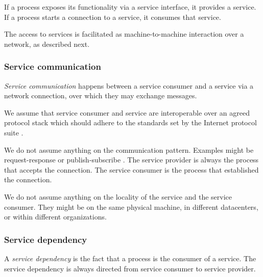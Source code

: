 If a process exposes its functionality via a service interface, it provides a service. If a process starts a connection to a service, it consumes that service.


The access to services is facilitated as machine-to-machine interaction over a network, as described next.

\subsubsection{Service communication}

\emph{Service communication} happens between a service consumer and a service via a network connection, over which they may exchange messages.

We assume that service consumer and service are interoperable over an agreed protocol stack which should adhere to the standards set by the Internet protocol suite \cite{internetprotocol}.

We do not assume anything on the communication pattern. Examples might be request-response \cite{requestresponse} or publish-subscribe \cite{publishsubscribe}. The service provider is always the process that accepts the connection. The service consumer is the process that established the connection.

We do not assume anything on the locality of the service and the service consumer. They might be on the same physical machine, in different datacenters, or within different organizations.

%

\subsubsection{Service dependency}
\label{subsec:service_depenedency}

A \emph{service dependency} is the fact that a process is the consumer of a service. The service dependency is always directed from service consumer to service provider.


